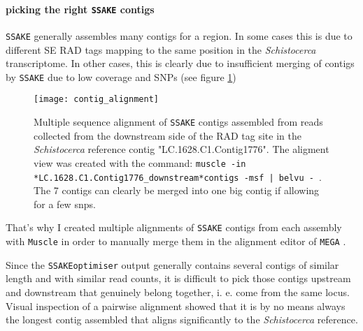 \documentclass[a4paper,12pt,times,authoryear,twoside,print,index]{Classes/PhDThesisPSnPDF}\usepackage[]{graphicx}\usepackage[]{color}
\begin{document}
%
%
%

\paragraph{picking the right \texttt{SSAKE} contigs}\label{ch:picking_right_contig}
\texttt{SSAKE} generally assembles many contigs for a region. In some cases this is due to different SE \glspl{RAD tag} mapping to the same position in the \textit{Schistocerca} transcriptome. In other cases, this is clearly due to insufficient merging of contigs by \texttt{SSAKE} due to low coverage and SNPs (see figure \ref{contig_alignment})
%
\begin{figure}
\centering
\texttt{[image: contig\_alignment]}
\caption{Multiple sequence alignment of \texttt{SSAKE} contigs assembled from reads collected from the downstream side of the RAD tag site in the \textit{Schistocerca} reference contig "LC.1628.C1.Contig1776". The aligment view was created with the command: \texttt{muscle -in *LC.1628.C1.Contig1776\_downstream*contigs -msf | belvu -}~. The 7 contigs can clearly be merged into one big contig if allowing for a few \glspl{snp}.}
\label{contig_alignment}
\end{figure}
%
That's why I created multiple alignments of \texttt{SSAKE} contigs from each assembly with \texttt{Muscle} \citep{Edgar2004} in order to manually merge them in the alignment editor of \texttt{MEGA} \citep{Tamura2013}.

Since the \texttt{SSAKEoptimiser} output generally contains several \glspl{contig} of similar length and with similar read counts, it is difficult to pick those contigs upstream and downstream that genuinely belong together, i. e. come from the same locus. Visual inspection of a pairwise alignment showed that it is by no means always the longest \gls{contig} assembled that aligns significantly to the \textit{Schistocerca} reference.
\end{document}
